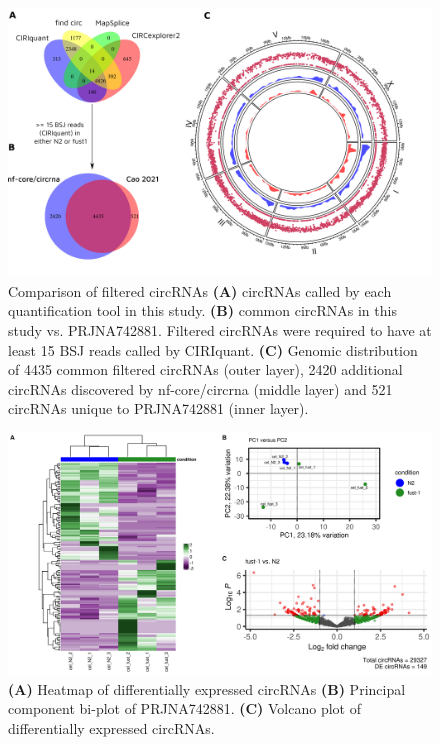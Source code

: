 \documentclass{bmcart}
\begin{document}
\begin{figure}[h!]
    \centering
    \includegraphics[width=12.25cm]{figure2.png}
    \vspace{-10mm}
    \caption{Comparison of filtered circRNAs \textbf{(A)} circRNAs called by each quantification tool in this study. \textbf{(B)} common circRNAs in this study vs. PRJNA742881. Filtered circRNAs were required to have at least 15 BSJ reads called by CIRIquant. \textbf{(C)} Genomic distribution of 4435 common filtered circRNAs (outer layer), 2420 additional circRNAs discovered by nf-core/circrna (middle layer) and 521 circRNAs unique to PRJNA742881 (inner layer).}
    \label{fig:2}
\end{figure}

\begin{figure}[h!]
    \centering
    \includegraphics[width=12.25cm]{figure3.png}
    \vspace{-10mm}
    \caption{\textbf{(A)} Heatmap of differentially expressed circRNAs \textbf{(B)} Principal component bi-plot of PRJNA742881. \textbf{(C)} Volcano plot of differentially expressed circRNAs.}
    \label{fig:3}
\end{figure}
\end{document}

